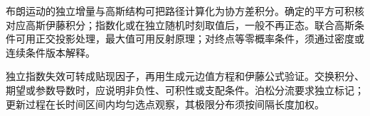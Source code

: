 布朗运动的独立增量与高斯结构可把路径计算化为协方差积分。确定的平方可积核对应高斯伊藤积分；指数化或在独立随机时刻取值后，一般不再正态。联合高斯条件可用正交投影处理，最大值可用反射原理；对终点等零概率条件，须通过密度或连续条件版本解释。

独立指数失效可转成贴现因子，再用生成元边值方程和伊藤公式验证。交换积分、期望或参数导数时，应说明非负性、可积性或支配条件。泊松分流要求独立标记；更新过程在长时间区间内均匀选点观察，其极限分布须按间隔长度加权。
\par\smallskip
